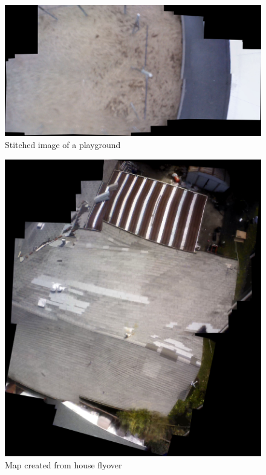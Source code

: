 \begin{figure}[h]
\begin{minipage}{.5\textwidth}
		\linebreak
		\caption{Stitched image of a playground}
		\label{fig:Playground}
		\centering
			\includegraphics[width=0.95\linewidth]{illustrations/maps/tanbark_structures}
	\end{minipage}
\end{figure}
\clearpage
\begin{figure}[H]
	\caption{Map created from house flyover}
	\label{fig:HouseStitch}
	\centering
		\includegraphics[width=\textwidth]{illustrations/maps/house}
\end{figure}

